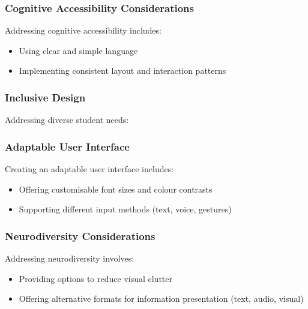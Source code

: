 \documentclass[14pt,a4paper]{article}
\begin{document}
\begin{multicols}{2}
\subsubsection*{Cognitive Accessibility Considerations}
Addressing cognitive accessibility \textit{\parencite[pp. 1-10]{Yesilada2023}} includes:
\begin{itemize}
    \item Using clear and simple language
    \item Implementing consistent layout and interaction patterns
\end{itemize}

\subsubsection*{Inclusive Design}
Addressing diverse student needs:



\subsubsection*{Adaptable User Interface}
Creating an adaptable user interface \textit{\parencite[pp. 20-50]{HarperYesilada2024}} includes:
\begin{itemize}
    \item Offering customisable font sizes and colour contrasts
    \item Supporting different input methods (text, voice, gestures)
\end{itemize}

\subsubsection*{Neurodiversity Considerations}
Addressing neurodiversity \textit{\parencite[pp. 30-60]{Armstrong2023}} involves:
\begin{itemize}
    \item Providing options to reduce visual clutter
    \item Offering alternative formats for information presentation (text, audio, visual)
\end{itemize}


\end{multicols}
\end{document}
